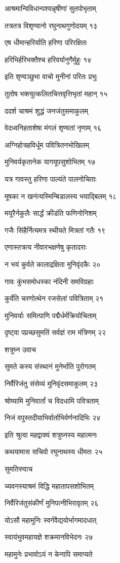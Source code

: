 आश्रमान्विविधान्पश्यन्नृषीणां सुतपोभृताम्

तत्रतत्र विशृण्वानो रघुनाथगुणोदयम् १३

एष धीमान्हरिर्याति हरिणा परिरक्षितः

हरिभिर्हरिभक्तैश्च हरिवर्यानुगैर्मुहुः १४

इति शृण्वञ्छुभा वाचो मुनीनां परितः प्रभुः

तुतोष भक्त्युत्कलितचित्तवृत्तिभृतां महान् १५

ददर्श चाश्रमं शुद्धं जनजंतुसमाकुलम्

वेदध्वनिहताशेषा मंगलं शृण्वतां नृणाम् १६

अग्निहोत्रहविर्धूम पवित्रितनभोखिलम्

मुनिवर्यकृतानेक यागयूपसुशोभितम् १७

यत्र गावस्तु हरिणा पाल्यंते पालनोचिताः

मूषका न खनंत्यस्मिन्बिडालस्य भयाद्बिलम् १८

मयूरैर्नकुलैः सार्द्धं क्रीडंति फणिनोनिशम्

गजैः सिंहैर्नित्यमत्र स्थीयते मित्रतां गतैः १९

एणास्तत्रत्य नीवारभक्षणेषु कृतादराः

न भयं कुर्वते कालाद्रक्षिता मुनिवृंदकैः २०

गावः कुंभसमोधस्का नंदिनी समविग्रहाः

कुर्वंति चरणोत्थेन रजसेलां पवित्रिताम् २१

मुनिवर्याः समित्पाणि पद्मैर्धर्मक्रियोचिताम्

दृष्ट्वा पप्रच्छसुमतिं सर्वज्ञं राम मंत्रिणम् २२

शत्रुघ्न उवाच

सुमते कस्य संस्थानं मुनेर्भाति पुरोगतम्

निर्वैरिजंतु संसेव्यं मुनिवृंदसमाकुलम् २३

श्रोष्यामि मुनिवार्तां च विदधामि पवित्रताम्

निजं वपुस्तदीयाभिर्वार्ताभिर्वर्णनादिभिः २४

इति श्रुत्वा महद्वाक्यं शत्रुघ्नस्य महात्मनः

कथयामास सचिवो रघुनाथस्य धीमतः २५

सुमतिरुवाच

च्यवनस्याश्रमं विद्धि महातापसशोभितम्

निर्वैरिजंतुसंकीर्णं मुनिपत्नीभिरावृतम् २६

योऽसौ महामुनिः स्वर्गवैद्ययोर्भागमादधात्

स्वायंभुवमहायज्ञे शक्रमानविभेदनः २७

महामुनेः प्रभावोऽयं न केनापि समाप्यते

